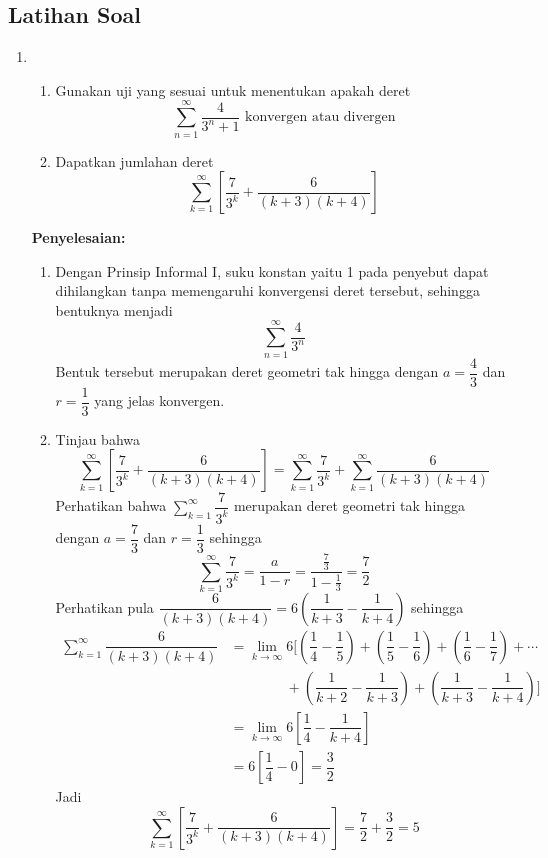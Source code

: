 \documentclass{article}
\begin{document}
\subsection{Latihan Soal}
\begin{enumerate}
	\item \begin{enumerate}
		\item Gunakan uji yang sesuai untuk menentukan apakah deret
	$$ \sum_{n=1}^\infty \dfrac{4}{3^n+1} \text{ konvergen atau divergen} $$
		\item Dapatkan jumlahan deret 
		$$ \sum_{k=1}^\infty \left[\dfrac{7}{3^k}+\dfrac{6}{(k+3)(k+4)}\right] $$
	\end{enumerate}
	\textbf{Penyelesaian:}
	\begin{enumerate}
		\item Dengan Prinsip Informal I, suku konstan yaitu 1 pada penyebut dapat dihilangkan tanpa memengaruhi konvergensi deret tersebut, sehingga bentuknya menjadi 
		$$ \sum_{n=1}^\infty \dfrac{4}{3^n} $$
		Bentuk tersebut merupakan deret geometri tak hingga dengan $a=\dfrac{4}{3}$ dan $r=\dfrac{1}{3}$ yang jelas konvergen.
		\item Tinjau bahwa 
		$$ \sum_{k=1}^\infty \left[\dfrac{7}{3^k}+\dfrac{6}{(k+3)(k+4)}\right] = \sum_{k=1}^\infty \dfrac{7}{3^k}+\sum_{k=1}^\infty \dfrac{6}{(k+3)(k+4)}  $$
		Perhatikan bahwa $\displaystyle \sum_{k=1}^\infty \dfrac{7}{3^k} $ merupakan deret geometri tak hingga dengan $a=\dfrac{7}{3}$ dan $r=\dfrac{1}{3}$ sehingga 
		$$ \sum_{k=1}^\infty \dfrac{7}{3^k} = \dfrac{a}{1-r} = \dfrac{\frac{7}{3}}{1-\frac{1}{3}} = \dfrac{7}{2} $$
		Perhatikan pula $\dfrac{6}{(k+3)(k+4)}=6\left(\dfrac{1}{k+3}-\dfrac{1}{k+4}\right)$ sehingga 
		\begin{align*}
		\sum_{k=1}^\infty \dfrac{6}{(k+3)(k+4)} &= \lim_{k\rightarrow \infty} 6\bigg[\left(\dfrac{1}{4}-\dfrac{1}{5}\right)+\left(\dfrac{1}{5}-\dfrac{1}{6}\right)+\left(\dfrac{1}{6}-\dfrac{1}{7}\right)+\cdots \\
		&\qquad \qquad +\left(\dfrac{1}{k+2}-\dfrac{1}{k+3}\right)+\left(\dfrac{1}{k+3}-\dfrac{1}{k+4}\right)\bigg]\\
		&= \lim_{k\rightarrow \infty} 6 \left[\dfrac{1}{4}-\dfrac{1}{k+4}\right]\\
		&= 6\left[\dfrac{1}{4}-0\right]=\dfrac{3}{2}
		\end{align*}
		Jadi 
		$$ \sum_{k=1}^\infty \left[\dfrac{7}{3^k}+\dfrac{6}{(k+3)(k+4)}\right] =\dfrac{7}{2} + \dfrac{3}{2} = 5 $$
	\end{enumerate}

\end{enumerate}
\end{document}
